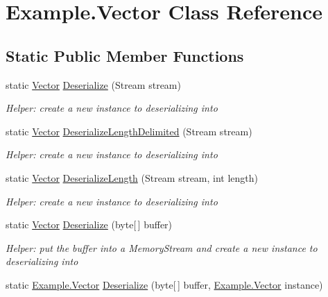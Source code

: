 \hypertarget{class_example_1_1_vector}{}\section{Example.\+Vector Class Reference}
\label{class_example_1_1_vector}


 


\subsection*{Static Public Member Functions}
\begin{DoxyCompactItemize}
\item 
static \hyperlink{class_example_1_1_vector}{Vector} \hyperlink{class_example_1_1_vector_a818efcb4e8291291770ef378c1f25e9e}{Deserialize} (Stream stream)
\begin{DoxyCompactList}\small\item\em Helper\+: create a new instance to deserializing into\end{DoxyCompactList}\item 
static \hyperlink{class_example_1_1_vector}{Vector} \hyperlink{class_example_1_1_vector_ac0d43068ece1c2630c4251dff5e8ada0}{Deserialize\+Length\+Delimited} (Stream stream)
\begin{DoxyCompactList}\small\item\em Helper\+: create a new instance to deserializing into\end{DoxyCompactList}\item 
static \hyperlink{class_example_1_1_vector}{Vector} \hyperlink{class_example_1_1_vector_abe963061d88c30a7242d5bb92828d18f}{Deserialize\+Length} (Stream stream, int length)
\begin{DoxyCompactList}\small\item\em Helper\+: create a new instance to deserializing into\end{DoxyCompactList}\item 
static \hyperlink{class_example_1_1_vector}{Vector} \hyperlink{class_example_1_1_vector_a9f29e4e1efdfb2e0841623ff2311cce5}{Deserialize} (byte\mbox{[}$\,$\mbox{]} buffer)
\begin{DoxyCompactList}\small\item\em Helper\+: put the buffer into a Memory\+Stream and create a new instance to deserializing into\end{DoxyCompactList}\item 
static \hyperlink{class_example_1_1_vector}{Example.\+Vector} \hyperlink{class_example_1_1_vector_a2bedbd5f974dd3d18fc86300b673f55d}{Deserialize} (byte\mbox{[}$\,$\mbox{]} buffer, \hyperlink{class_example_1_1_vector}{Example.\+Vector} instance)

\end{DoxyCompactItemize}
